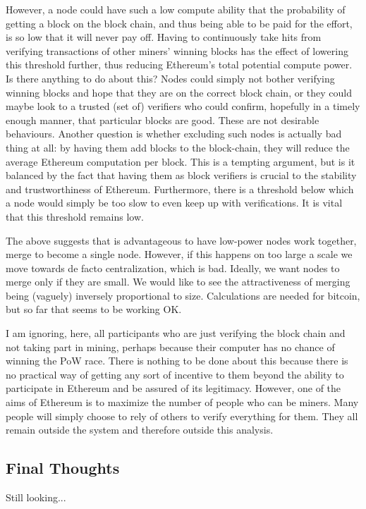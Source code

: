 \documentclass[10pt,a4paper]{article}
\begin{document}
However, a node could have such a low compute ability that the probability of getting a block on the block chain, and thus being able to be paid for the effort, is so low that it will never pay off. Having to continuously take hits from verifying transactions of other miners' winning blocks has the effect of lowering this threshold further, thus reducing Ethereum's total potential compute power. Is there anything to do about this? Nodes could simply not bother verifying winning blocks and hope that they are on the correct block chain, or they could maybe look to a trusted (set of) verifiers who could confirm, hopefully in a timely enough manner, that particular blocks are good. These are not desirable behaviours. Another question is whether excluding such nodes is actually bad thing at all: by having them add blocks to the block-chain, they will reduce the average Ethereum computation per block. This is a tempting argument, but is it balanced by the fact that having them as block verifiers is crucial to the stability and trustworthiness of Ethereum. Furthermore, there is a threshold below which a node would simply be too slow to even keep up with verifications. It is vital that this threshold remains low.

The above suggests that is advantageous to have low-power nodes work together, \ie merge to become a single node. However, if this happens on too large a scale we move towards de facto centralization, which is bad. Ideally, we want nodes to merge only if they are small. We would like to see the attractiveness of merging being (vaguely) inversely proportional to size. Calculations are needed for bitcoin, but so far that seems to be working OK.

I am ignoring, here, all participants who are just verifying the block chain and not taking part in mining, perhaps because their computer has no chance of winning the PoW race. There is nothing to be done about this because there is no practical way of getting any sort of incentive to them beyond the ability to participate in Ethereum and be assured of its legitimacy. However, one of the aims of Ethereum is to maximize the number of people who can be miners. Many people will simply choose to rely of others to verify everything for them. They all remain outside the system and therefore outside this analysis.

\subsection*{Final Thoughts}

Still looking...
\end{document}
